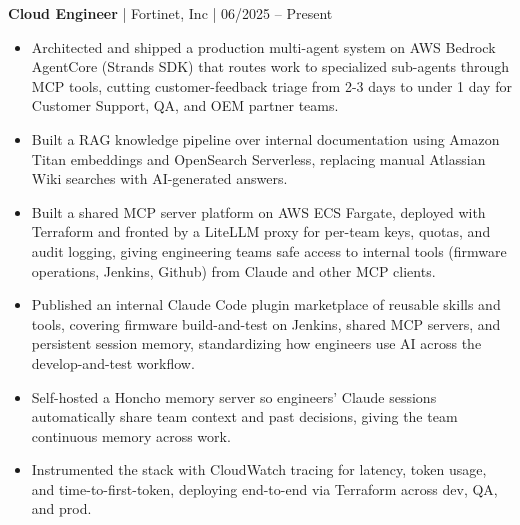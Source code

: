\textbf{Cloud Engineer} | Fortinet, Inc | 06/2025 -- Present
\begin{itemize}
  \item Architected and shipped a production multi-agent system on AWS Bedrock AgentCore (Strands SDK) that routes work to specialized sub-agents through MCP tools, cutting customer-feedback triage from 2-3 days to under 1 day for Customer Support, QA, and OEM partner teams.
  \item Built a RAG knowledge pipeline over internal documentation using Amazon Titan embeddings and OpenSearch Serverless, replacing manual Atlassian Wiki searches with AI-generated answers.
  \item Built a shared MCP server platform on AWS ECS Fargate, deployed with Terraform and fronted by a LiteLLM proxy for per-team keys, quotas, and audit logging, giving engineering teams safe access to internal tools (firmware operations, Jenkins, Github) from Claude and other MCP clients.
  \item Published an internal Claude Code plugin marketplace of reusable skills and tools, covering firmware build-and-test on Jenkins, shared MCP servers, and persistent session memory, standardizing how engineers use AI across the develop-and-test workflow.
  \item Self-hosted a Honcho memory server so engineers' Claude sessions automatically share team context and past decisions, giving the team continuous memory across work.
  \item Instrumented the stack with CloudWatch tracing for latency, token usage, and time-to-first-token, deploying end-to-end via Terraform across dev, QA, and prod.
\end{itemize}
